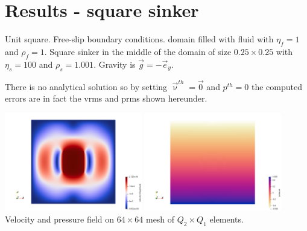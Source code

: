 \newpage
\section*{Results - square sinker}

Unit square. Free-slip boundary conditions. domain filled with fluid with $\eta_f=1$ and $\rho_f=1$.
Square sinker in the middle of the domain of size $0.25\times 0.25$ with $\eta_s=100$ and
$\rho_s=1.001$. Gravity is $\vec{g}=-\vec{e}_y$. 

There is no analytical solution so by setting $\vec{\upnu}^{th}=\vec{0}$ and 
$p^{th}=0$ the computed errors are in fact the vrms and prms shown hereunder.

\begin{center}
\includegraphics[width=6cm]{python_codes/fieldstone_120/results_sinker/velocity}
\includegraphics[width=6cm]{python_codes/fieldstone_120/results_sinker/pressure}\\
{\captionfont Velocity and pressure field on $64\times 64$ mesh of $Q_2\times Q_1$ elements.}
\end{center}

